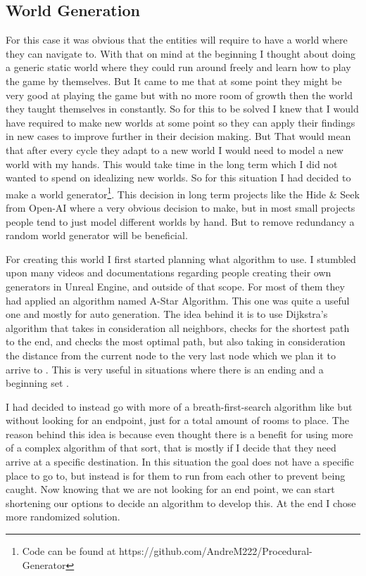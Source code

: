 \documentclass[10pt, letterpaper]{article}
\begin{document}
\begin{Form}
	\section{World Generation}
	For this case it was obvious that the entities will require to have a world where they can navigate to.
	With that on mind at the beginning I thought about doing a generic static world where they could run around
	freely and learn how to play the game by themselves. But It came to me that at some point they might be very
	good at playing the game but with no more room of growth then the world they taught themselves in constantly.
	So for this to be solved I knew that I would have required to make new worlds at some point so they can apply
	their findings in new cases to improve further in their decision making. But That would mean that after every
	cycle they adapt to a new world I would need to model a new world with my hands. This would take time in the
	long term which I did not wanted to spend on idealizing new worlds. So for this situation I had decided to make
	a world generator\footnote{Code can be found at https://github.com/AndreM222/Procedural-Generator}. This decision
	in long term projects like the Hide \& Seek from Open-AI where a very obvious decision to make, but in most small
	projects people tend to just model different worlds by hand. But to remove redundancy a random world generator will
	be beneficial.

	For creating this world I first started planning what algorithm to use. I stumbled upon many videos and
	documentations regarding people creating their own generators in Unreal Engine, and outside of that scope.
	For most of them they had applied an algorithm named A-Star Algorithm. This one was quite a useful one and mostly
	for auto generation. The idea behind it is to use Dijkstra's algorithm that takes in consideration all neighbors,
	checks for the shortest path to the end, and checks the most optimal path, but also taking in consideration the
	distance from the current node to the very last node which we plan it to arrive to \parencite{AStarAlgorithm}. This is very useful in situations
	where there is an ending and a beginning set \parencite{IRewroteMyDungeonGenerator}.

	I had decided to instead go with more of a breath-first-search algorithm \parencite{BreadthFirstSearch} like but without looking for an
	endpoint, just for a total amount of rooms to place. The reason behind this idea is because even thought
	there is a benefit for using more of a complex algorithm of that sort, that is mostly if I decide that they need
	arrive at a specific destination. In this situation the goal does not have a specific place to go to, but
	instead is for them to run from each other to prevent being caught. Now knowing that we are not looking for an
	end point, we can start shortening our options to decide an algorithm to develop this. At the end I chose more
	randomized solution.


\end{Form}
\end{document}

